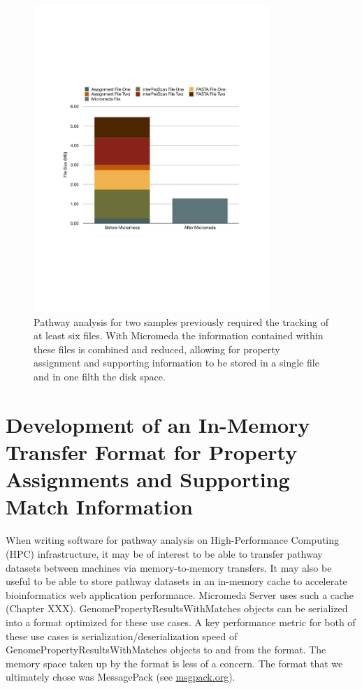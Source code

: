 \begin{figure}[!ht]
  \centering
	\includegraphics[width=0.80\textwidth]{media/micromeda_file_size.pdf}
	 \caption{Pathway analysis for two samples previously required the tracking of at least six files. With Micromeda the information contained within these files is combined and reduced, allowing for property assignment and supporting information to be stored in a single file and in one filth the disk space.}
	 \label{fig:micromedafilesize}
\end{figure}

\section{Development of an In-Memory Transfer Format for Property Assignments and Supporting Match Information} \label{msgpack}

When writing software for pathway analysis on High-Performance Computing (HPC) infrastructure, it may be of interest to be able to transfer pathway datasets between machines via memory-to-memory transfers. It may also be useful to be able to store pathway datasets in an in-memory cache to accelerate bioinformatics web application performance. Micromeda Server uses such a cache (Chapter XXX). GenomePropertyResultsWithMatches objects can be serialized into a format optimized for these use cases. A key performance metric for both of these use cases is serialization/deserialization speed of GenomePropertyResultsWithMatches objects to and from the format. The memory space taken up by the format is less of a concern. The format that we ultimately chose was MessagePack  \cite{furuhashi2013messagepack}(see \href{msgpack.org}{msgpack.org}).

